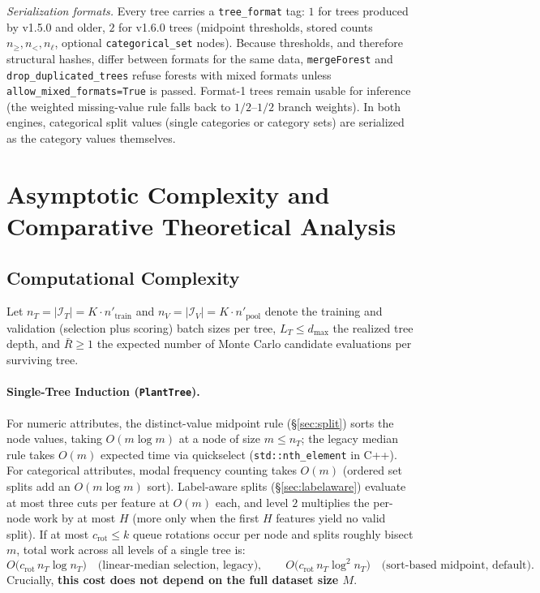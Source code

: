 \documentclass[11pt,a4paper]{article}
\newcommand{\code}[1]{\texttt{#1}}
\begin{document}
\noindent\emph{Serialization formats.} Every tree carries a \code{tree\_format} tag: $1$ for trees produced by v1.5.0 and older, $2$ for v1.6.0 trees (midpoint thresholds, stored counts $n_{\ge}, n_{<}, n_{\ell}$, optional \code{categorical\_set} nodes). Because thresholds, and therefore structural hashes, differ between formats for the same data, \code{mergeForest} and \code{drop\_\allowbreak duplicated\_\allowbreak trees} refuse forests with mixed formats unless \code{allow\_mixed\_formats=True} is passed. Format-1 trees remain usable for inference (the weighted missing-value rule falls back to $1/2$--$1/2$ branch weights). In both engines, categorical split values (single categories or category sets) are serialized as the category values themselves.

\section{Asymptotic Complexity and Comparative Theoretical Analysis}

\subsection{Computational Complexity}

Let $n_T = |\mathcal{I}_T| = K \cdot n'_{\text{train}}$ and $n_V = |\mathcal{I}_V| = K \cdot n'_{\text{pool}}$ denote the training and validation (selection plus scoring) batch sizes per tree, $L_T \le d_{\max}$ the realized tree depth, and $\bar{R} \ge 1$ the expected number of Monte Carlo candidate evaluations per surviving tree.

\paragraph{Single-Tree Induction (\code{PlantTree}).}
For numeric attributes, the distinct-value midpoint rule (\S\ref{sec:split}) sorts the node values, taking $O(m \log m)$ at a node of size $m \le n_T$; the legacy median rule takes $O(m)$ expected time via quickselect (\code{std::nth\_element} in C++). For categorical attributes, modal frequency counting takes $O(m)$ (ordered set splits add an $O(m \log m)$ sort). Label-aware splits (\S\ref{sec:labelaware}) evaluate at most three cuts per feature at $O(m)$ each, and level $2$ multiplies the per-node work by at most $H$ (more only when the first $H$ features yield no valid split). If at most $c_{\text{rot}} \le k$ queue rotations occur per node and splits roughly bisect $m$, total work across all levels of a single tree is:
\begin{equation}
  O\!\big(c_{\text{rot}} \, n_T \log n_T\big) \quad \text{(linear-median selection, legacy)},
  \qquad
  O\!\big(c_{\text{rot}} \, n_T \log^2 n_T\big) \quad \text{(sort-based midpoint, default)}.
\end{equation}
Crucially, \textbf{this cost does not depend on the full dataset size $M$}.
\end{document}
